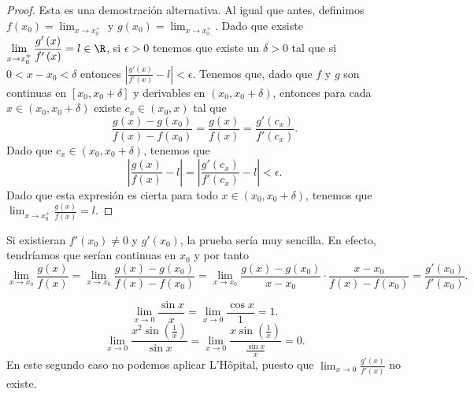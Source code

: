 \begin{proof}
	Esta es una demostración alternativa. Al igual que antes, definimos $\displaystyle f\left(x_{0}\right) = \lim_{x \to x_{0}^{+}} $ y $\displaystyle g\left(x_{0}\right) = \lim_{x \to x_{0}^{+}} $. Dado que exsiste $\displaystyle \lim_{x \to x_{0}^{+}} \frac{g'\left(x\right)}{f'\left(x\right)} = l \in \R$, si $\displaystyle \epsilon > 0 $ tenemos que existe un $\displaystyle \delta > 0 $ tal que si $\displaystyle 0 < x - x_{0} < \delta  $ entonces $\displaystyle \left|\frac{g'\left(x\right)}{f'\left(x\right)} - l\right| < \epsilon  $. Tenemos que, dado que $\displaystyle f $ y $\displaystyle g $ son continuas en $\displaystyle \left[x_{0}, x_{0}+\delta \right]  $ y derivables en $\displaystyle \left(x_{0}, x_{0}+\delta \right) $, entonces para cada $\displaystyle x \in (x_{0}, x_{0}+\delta) $  existe $\displaystyle c_{x} \in \left(x_{0}, x \right) $ tal que
	\[ \frac{g\left(x\right)-g\left(x_{0}\right)}{f\left(x\right)-f\left(x_{0}\right)} = \frac{g\left(x\right)}{f\left(x\right)} = \frac{g'\left(c_{x}\right)}{f'\left(c_{x}\right)} .\]
	Dado que $\displaystyle c_{x} \in \left(x_{0}, x_{0}+ \delta \right) $, tenemos que
	\[ \left|\frac{g\left(x\right)}{f\left(x\right)}-l\right| = \left|\frac{g'\left(c_{x}\right)}{f'\left(c_{x}\right)}-l\right|<\epsilon .\]
Dado que esta expresión es cierta para todo $\displaystyle x \in \left(x_{0}, x_{0}+\delta \right) $, tenemos que $\displaystyle \lim_{x \to x_{0}^{+}}\frac{g\left(x\right)}{f\left(x\right)} = l $.	
\end{proof}
\begin{observation}
\normalfont Si existieran $\displaystyle f'\left(x_{0}\right) \neq 0 $ y $\displaystyle g'\left(x_{0}\right) $, la prueba sería muy sencilla. En efecto, tendríamos que serían continuas en $\displaystyle x_{0} $ y por tanto
\[ \lim_{x \to x_{0}}\frac{g\left(x\right)}{f\left(x\right)} = \lim_{x \to x_{0}}\frac{g\left(x\right)-g\left(x_{0}\right)}{f\left(x\right)-f\left(x_{0}\right)} = \lim_{x \to x_{0}} \frac{g\left(x\right)-g\left(x_{0}\right)}{x - x_{0}} \cdot \frac{x - x_{0}}{f\left(x\right)-f\left(x_{0}\right)} = \frac{g'\left(x_{0}\right)}{f'\left(x_{0}\right)} .\]
\end{observation}
\begin{eg}
\normalfont 
\[\lim_{x \to 0}\frac{\sin x}{x} = \lim_{x \to 0} \frac{\cos x}{1} = 1 .\]
\[ \lim_{x \to 0}\frac{x^{2}\sin\left(\frac{1}{x}\right)}{\sin x} = \lim_{x \to 0}\frac{x \sin\left(\frac{1}{x}\right)}{\frac{\sin x}{x}} =  0 .\]
En este segundo caso no podemos aplicar L'Hôpital, puesto que $\displaystyle \lim_{x \to 0}\frac{g'\left(x\right)}{f'\left(x\right)} $ no existe.
\end{eg}
